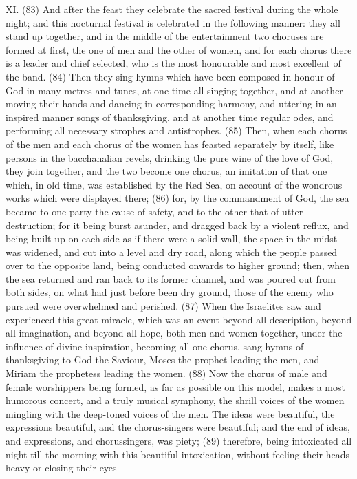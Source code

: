 XI. (83) And after the feast they celebrate the sacred festival during the whole night; and this
nocturnal festival is celebrated in the following manner: they all stand up together, and in the middle
of the entertainment two choruses are formed at first, the one of men and the other of women, and
for each chorus there is a leader and chief selected, who is the most honourable and most
excellent of the band. (84) Then they sing hymns which have been composed in honour of God in
many metres and tunes, at one time all singing together, and at another moving their hands and
dancing in corresponding harmony, and uttering in an inspired manner songs of thanksgiving, and
at another time regular odes, and performing all necessary strophes and antistrophes. (85) Then,
when each chorus of the men and each chorus of the women has feasted separately by itself, like
persons in the bacchanalian revels, drinking the pure wine of the love of God, they join together,
and the two become one chorus, an imitation of that one which, in old time, was established by the
Red Sea, on account of the wondrous works which were displayed there; (86) for, by the
commandment of God, the sea became to one party the cause of safety, and to the other that of
utter destruction; for it being burst asunder, and dragged back by a violent reflux, and being built up
on each side as if there were a solid wall, the space in the midst was widened, and cut into a level
and dry road, along which the people passed over to the opposite land, being conducted onwards
to higher ground; then, when the sea returned and ran back to its former channel, and was poured
out from both sides, on what had just before been dry ground, those of the enemy who pursued
were overwhelmed and perished. (87) When the Israelites saw and experienced this great miracle,
which was an event beyond all description, beyond all imagination, and beyond all hope, both men
and women together, under the influence of divine inspiration, becoming all one chorus, sang
hymns of thanksgiving to God the Saviour, Moses the prophet leading the men, and Miriam the
prophetess leading the women. (88) Now the chorus of male and female worshippers being
formed, as far as possible on this model, makes a most humorous concert, and a truly musical
symphony, the shrill voices of the women mingling with the deep-toned voices of the men. The
ideas were beautiful, the expressions beautiful, and the chorus-singers were beautiful; and the end
of ideas, and expressions, and chorussingers, was piety; (89) therefore, being intoxicated all night
till the morning with this beautiful intoxication, without feeling their heads heavy or closing their eyes

